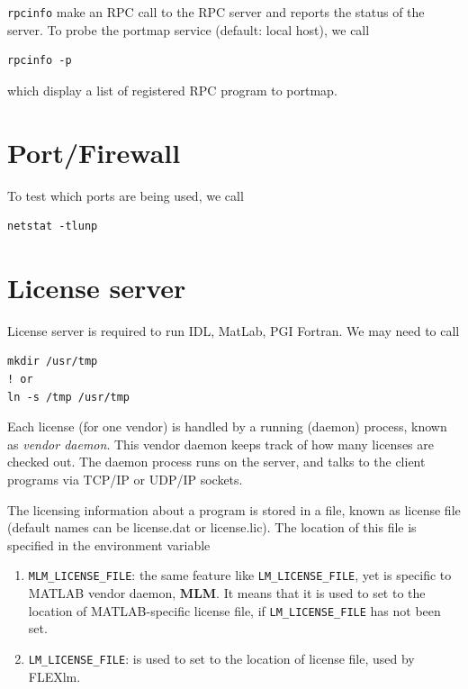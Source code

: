 \verb!rpcinfo! make an RPC call to the RPC server and reports the status of the
server. To probe the portmap service (default:
local host), we call
\begin{verbatim}
rpcinfo -p
\end{verbatim}
which display a list of registered RPC program to portmap.



\section{Port/Firewall}


To test which ports are being used, we call
\begin{verbatim}
netstat -tlunp
\end{verbatim}

\section{License server}

License server is required to run IDL, MatLab, PGI Fortran. We may need to call
\begin{verbatim}
mkdir /usr/tmp
! or 
ln -s /tmp /usr/tmp
\end{verbatim}

Each license (for one vendor) is handled by a running (daemon) process, known as
{\it vendor daemon}. This vendor daemon keeps track of how many licenses are checked
out. The daemon process runs on the server, and talks to the client programs via
TCP/IP or UDP/IP sockets. 

The licensing information about a program is stored in a file, known as license
file (default names can be license.dat or license.lic). The location of this
file is specified in the environment variable
\begin{enumerate}
  \item \verb!MLM_LICENSE_FILE!: the same feature like \verb!LM_LICENSE_FILE!, yet
  is specific to MATLAB vendor daemon, {\bf MLM}. It means that it is used to
  set to the location of MATLAB-specific license file, if \verb!LM_LICENSE_FILE! has
  not been set.
  \item \verb!LM_LICENSE_FILE!: is used to set to the location of license
  file, used by FLEXlm. 
\end{enumerate}

